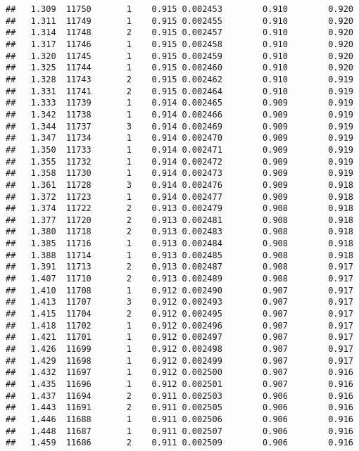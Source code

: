 \documentclass[
]{book}
\begin{document}
\begin{verbatim}
##   1.309  11750       1    0.915 0.002453        0.910        0.920
##   1.311  11749       1    0.915 0.002455        0.910        0.920
##   1.314  11748       2    0.915 0.002457        0.910        0.920
##   1.317  11746       1    0.915 0.002458        0.910        0.920
##   1.320  11745       1    0.915 0.002459        0.910        0.920
##   1.325  11744       1    0.915 0.002460        0.910        0.920
##   1.328  11743       2    0.915 0.002462        0.910        0.919
##   1.331  11741       2    0.915 0.002464        0.910        0.919
##   1.333  11739       1    0.914 0.002465        0.909        0.919
##   1.342  11738       1    0.914 0.002466        0.909        0.919
##   1.344  11737       3    0.914 0.002469        0.909        0.919
##   1.347  11734       1    0.914 0.002470        0.909        0.919
##   1.350  11733       1    0.914 0.002471        0.909        0.919
##   1.355  11732       1    0.914 0.002472        0.909        0.919
##   1.358  11730       1    0.914 0.002473        0.909        0.919
##   1.361  11728       3    0.914 0.002476        0.909        0.918
##   1.372  11723       1    0.914 0.002477        0.909        0.918
##   1.374  11722       2    0.913 0.002479        0.908        0.918
##   1.377  11720       2    0.913 0.002481        0.908        0.918
##   1.380  11718       2    0.913 0.002483        0.908        0.918
##   1.385  11716       1    0.913 0.002484        0.908        0.918
##   1.388  11714       1    0.913 0.002485        0.908        0.918
##   1.391  11713       2    0.913 0.002487        0.908        0.917
##   1.407  11710       2    0.913 0.002489        0.908        0.917
##   1.410  11708       1    0.912 0.002490        0.907        0.917
##   1.413  11707       3    0.912 0.002493        0.907        0.917
##   1.415  11704       2    0.912 0.002495        0.907        0.917
##   1.418  11702       1    0.912 0.002496        0.907        0.917
##   1.421  11701       1    0.912 0.002497        0.907        0.917
##   1.426  11699       1    0.912 0.002498        0.907        0.917
##   1.429  11698       1    0.912 0.002499        0.907        0.917
##   1.432  11697       1    0.912 0.002500        0.907        0.916
##   1.435  11696       1    0.912 0.002501        0.907        0.916
##   1.437  11694       2    0.911 0.002503        0.906        0.916
##   1.443  11691       2    0.911 0.002505        0.906        0.916
##   1.446  11688       1    0.911 0.002506        0.906        0.916
##   1.448  11687       1    0.911 0.002507        0.906        0.916
##   1.459  11686       2    0.911 0.002509        0.906        0.916

\end{verbatim}
\end{document}
